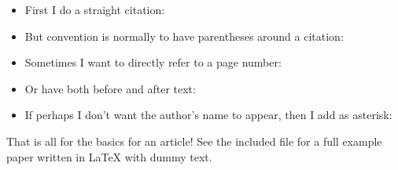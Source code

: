 \documentclass{article}
\begin{document}
\begin{itemize}
  \item First I do a straight citation: \cite{blais_vote_2000} %
  \item But convention is normally to have parentheses around a citation: \parencite{kymlicka_multicultural_1995} %
  \item Sometimes I want to directly refer to a page number: \parencite[p. 10]{gidengil_dominance_2012} %
  \item Or have both before and after text: \parencite[see for example][pp. 8-15]{stolle_getting_2001} %
    \item If perhaps I don't want the author's name to appear, then I add as asterisk: \parencite*{fournier_when_2011} 
\end{itemize}

That is all for the basics for an article! See the included file for a full example paper written in LaTeX with dummy text.


\clearpage \singlespacing %
\printbibliography %
\end{document}
